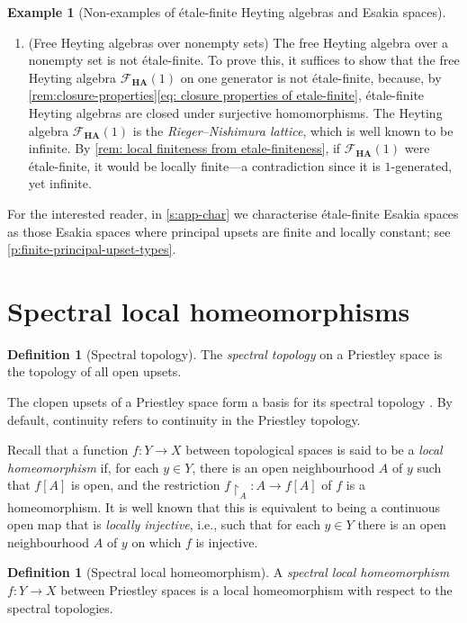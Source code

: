 \documentclass[12pt]{amsart}
\theoremstyle{plain}
\theoremstyle{definition}
\newtheorem{definition}[theorem]{Definition}
\newtheorem{example}[theorem]{Example}
\newcommand{\cat}[1]{\mathbf{#1}}
\newcommand{\HA}{\cat{HA}}
\begin{document}
\begin{example}[Non-examples of étale-finite Heyting algebras and Esakia spaces]
\begin{enumerate}
        \item (Free Heyting algebras over nonempty sets)
        The free Heyting algebra over a nonempty set is not étale-finite.
        To prove this, it suffices to show that the free Heyting algebra $\mathcal{F}_{\HA}(1)$ on one generator is not étale-finite, because, by \cref{rem:closure-properties}\eqref{eq: closure properties of etale-finite}, étale-finite Heyting algebras are closed under surjective homomorphisms. The Heyting algebra $\mathcal{F}_{\HA}(1)$ is the \emph{Rieger--Nishimura lattice}, which is well known to be infinite. By \cref{rem: local finiteness from etale-finiteness}, if $\mathcal{F}_{\HA}(1)$ were étale-finite, it would be locally finite---a contradiction since it is $1$-generated, yet infinite.               
    \end{enumerate}
\end{example}


For the interested reader, in \cref{s:app-char} we characterise étale-finite Esakia spaces as those Esakia spaces where principal upsets are finite and locally constant; see \cref{p:finite-principal-upset-types}.


\section{Spectral local homeomorphisms} \label{sec:speclochomeo}

\begin{definition}[Spectral topology] \label{def:spectral-topology}
    The \emph{spectral topology} on a Priestley space is the topology of all open upsets.
\end{definition}

The clopen upsets of a Priestley space form a basis for its spectral topology \cite[Lem.~2.1]{W1975}. By default, continuity refers to continuity in the Priestley topology.


Recall that a function $f \colon Y \to X$ between topological spaces is said to be a \emph{local homeomorphism} if, for each $y\in Y$, there is an open neighbourhood $A$ of $y$ such that $f[A]$ is open, and the restriction $f{\restriction}_{A}\colon A\to f[A]$ of $f$ is a homeomorphism. It is well known that this is equivalent to being a continuous open map that is \emph{locally injective}, i.e., such that for each $y\in Y$ there is an open neighbourhood $A$ of $y$ on which $f$ is injective.

\begin{definition}[Spectral local homeomorphism]
    A \emph{spectral local homeomorphism} $f\colon Y\to X$ between Priestley spaces is a local homeomorphism with respect to the spectral topologies.
\end{definition}
\end{document}
